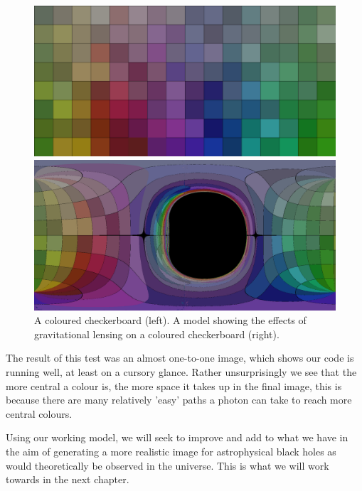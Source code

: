 \documentclass[oneside,openright,frontopenright, singlespacing]{dmathesis}
\begin{document}
\begin{figure}[!ht]
	\centering
	\begin{minipage}{0.5\textwidth}
		\centering
		\includegraphics[width=0.95\linewidth]{img/checkerboard-own}
	\end{minipage}%
	\hfill
	\begin{minipage}{0.5\textwidth}
		\centering
		\includegraphics[width=0.95\linewidth]{img/checkerboard-own-kerr}
	\end{minipage}
	\caption{A coloured checkerboard (left). A model showing the effects of gravitational lensing on a coloured checkerboard (right).}
	\label{fig:Figure4.6}
\end{figure}

	The result of this test was an almost one-to-one image, which shows our code is running well, at least on a cursory glance. Rather unsurprisingly we see that the more central a colour is, the more space it takes up in the final image, this is because there are many relatively 'easy' paths a photon can take to reach more central colours.

\vspace{1em}
	Using our working model, we will seek to improve and add to what we have in the aim of generating a more realistic image for astrophysical black holes as would theoretically be observed in the universe. This is what we will work towards in the next chapter.
\end{document}
